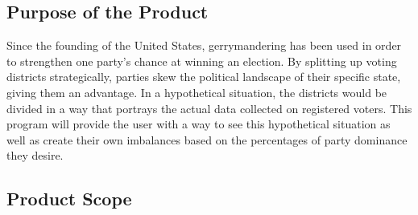 \documentclass{article}
\begin{document}
\vspace{2.5mm}


\subsection{Purpose of the Product}

\vspace{2.5mm}

\begin{addmargin}[4em]{0em}

Since the founding of the United States, gerrymandering has been used in order to strengthen one party's chance at winning an election. By splitting up voting districts strategically, parties skew the political landscape of their specific state, giving them an advantage. In a hypothetical situation, the districts would be divided in a way that portrays the actual data collected on registered voters. This program will provide the user with a way to see this hypothetical situation as well as create their own imbalances based on the percentages of party dominance they desire.

\vspace{2.5mm}

\end{addmargin}


\subsection{Product Scope}

\vspace{2.5mm}
\end{document}
